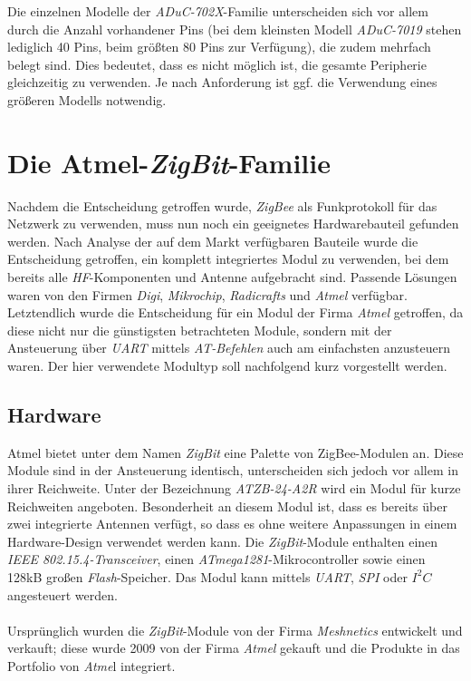         Die einzelnen Modelle der \emph{ADuC-702X}-Familie unterscheiden sich vor allem durch die Anzahl vorhandener 
        Pins (bei dem kleinsten Modell \emph{ADuC-7019} stehen lediglich 40 Pins, beim größten 80 Pins zur Verfügung), 
        die zudem mehrfach belegt sind. Dies bedeutet, dass es nicht möglich ist, die gesamte Peripherie gleichzeitig zu 
        verwenden. Je nach Anforderung ist ggf. die Verwendung eines größeren Modells notwendig. 


\section{Die Atmel-\emph{ZigBit}-Familie}

    Nachdem die Entscheidung getroffen wurde, \emph{ZigBee} als Funkprotokoll für das Netzwerk zu verwenden, muss
    nun noch ein geeignetes Hardwarebauteil gefunden werden. Nach Analyse der auf dem Markt verfügbaren Bauteile
    wurde die Entscheidung getroffen, ein komplett integriertes Modul zu verwenden, bei dem bereits alle 
    \emph{HF}-Komponenten und Antenne aufgebracht sind. Passende Lösungen waren von den Firmen \emph{Digi}, 
    \emph{Mikrochip}, \emph{Radicrafts} und \emph{Atmel} verfügbar. Letztendlich wurde die Entscheidung für
    ein Modul der Firma \emph{Atmel} getroffen, da diese nicht nur die günstigsten betrachteten Module,
    sondern mit der Ansteuerung über \emph{UART} mittels \emph{AT-Befehlen} auch am einfachsten anzusteuern waren.
    Der hier verwendete Modultyp soll nachfolgend kurz vorgestellt werden.

    \subsection{Hardware}

        Atmel bietet unter dem Namen \emph{ZigBit} eine Palette von ZigBee-Modulen an. Diese Module sind in der
        Ansteuerung identisch, unterscheiden sich jedoch vor allem in ihrer Reichweite. Unter der Bezeichnung 
        \emph{ATZB-24-A2R} wird ein Modul für kurze Reichweiten angeboten. Besonderheit an diesem Modul ist, 
        dass es bereits über zwei integrierte Antennen verfügt, so dass es ohne weitere Anpassungen in einem 
        Hardware-Design verwendet werden kann.
        Die \emph{ZigBit}-Module enthalten einen \emph{IEEE 802.15.4-Transceiver}, einen 
        \emph{ATmega1281}-Mikrocontroller sowie einen
        128kB großen \emph{Flash}-Speicher. Das Modul kann mittels \emph{UART}, \emph{SPI} oder \emph{$I^2C$} angesteuert 
        werden.\\
        \\
        Ursprünglich wurden die \emph{ZigBit}-Module von der Firma \emph{Meshnetics} entwickelt und verkauft; diese wurde 
        2009 von der Firma \emph{Atmel} gekauft und die Produkte in das Portfolio von \emph{Atme}l integriert.

